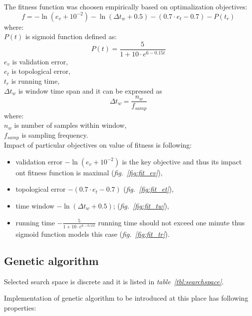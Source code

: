 \documentclass[a4paper]{IEEEtran}
\begin{document}
The fitness function was choosen empirically based on optimalization objectives:
\[ f = -\ln(e_v+10^{-2 }) - \ln(\Delta t_w+0.5) - (0.7\cdot e_t-0.7) - P(t_r) \]
where:\\
$ P(t) $ is sigmoid function defined as:
\[ P(t) = \frac{5}{1+10\cdot e^{6-0.15t}} \]
$ e_v $ is validation error,\\
$ e_t $ is topological error,\\
$ t_r $ is running time,\\
$ \Delta t_w $ is window time span and it can be expressed as 
\[  \Delta t_w = \frac{n_w}{f_{samp}}  \]
where:\\
$ n_w $ is number of samples within window,\\
$ f_{samp} $ is sampling frequency.
\\

Impact of particular objectives on value of fitness is following:
\begin{itemize}
	\item validation error $ -\ln(e_v+10^{-2 }) $ is the key objective and thus its impact
	ont fitness function is maximal (\textit{fig.~\ref{fig:fit_ev}}),
	\item topological error $ -(0.7\cdot e_t-0.7) $ (\textit{fig.~\ref{fig:fit_et}}),
	\item time window $ -\ln(\Delta t_w+0.5) $; (\textit{fig.~\ref{fig:fit_tw}}),
	\item running time $ -\frac{5}{1+10\cdot e^{6-0.15t}} $ running
	time should not exceed one minute thus sigmoid function models this case 
	(\textit{fig.~\ref{fig:fit_tr}}).
\end{itemize}

\subsection{Genetic algorithm}
Selected search space is discrete and it is listed  in \textit{table~\ref{tbl:searchspace}}.%

Implementation of genetic algorithm to be introduced at this place
has following properties:
\end{document}
